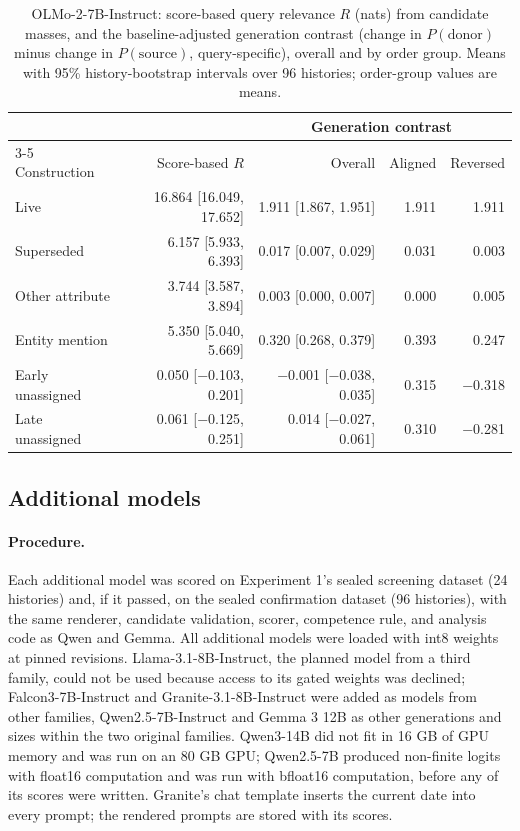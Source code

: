 \begin{table}[h]
\caption{OLMo-2-7B-Instruct: score-based query relevance $R$ (nats) from candidate masses, and the baseline-adjusted generation contrast (change in $P(\text{donor})$ minus change in $P(\text{source})$, query-specific), overall and by order group. Means with 95\% history-bootstrap intervals over 96 histories; order-group values are means.}
\label{tab:f-olmo-r}
\begin{center}
\small
\begin{tabular}{@{}lrrrr@{}}
\toprule
 & & \multicolumn{3}{c}{Generation contrast} \\
\cmidrule(l){3-5}
Construction & Score-based $R$ & Overall & Aligned & Reversed \\
\midrule
Live & 16.864 [16.049, 17.652] & 1.911 [1.867, 1.951] & 1.911 & 1.911 \\
Superseded & 6.157 [5.933, 6.393] & 0.017 [0.007, 0.029] & 0.031 & 0.003 \\
Other attribute & 3.744 [3.587, 3.894] & 0.003 [0.000, 0.007] & 0.000 & 0.005 \\
Entity mention & 5.350 [5.040, 5.669] & 0.320 [0.268, 0.379] & 0.393 & 0.247 \\
Early unassigned & 0.050 [−0.103, 0.201] & −0.001 [−0.038, 0.035] & 0.315 & −0.318 \\
Late unassigned & 0.061 [−0.125, 0.251] & 0.014 [−0.027, 0.061] & 0.310 & −0.281 \\
\bottomrule
\end{tabular}
\end{center}
\end{table}

\subsection{Additional models}

\paragraph{Procedure.} Each additional model was scored on Experiment 1's sealed screening dataset (24 histories) and, if it passed, on the sealed confirmation dataset (96 histories), with the same renderer, candidate validation, scorer, competence rule, and analysis code as Qwen and Gemma. All additional models were loaded with int8 weights at pinned revisions. Llama-3.1-8B-Instruct, the planned model from a third family, could not be used because access to its gated weights was declined; Falcon3-7B-Instruct and Granite-3.1-8B-Instruct were added as models from other families, Qwen2.5-7B-Instruct and Gemma 3 12B as other generations and sizes within the two original families. Qwen3-14B did not fit in 16 GB of GPU memory and was run on an 80 GB GPU; Qwen2.5-7B produced non-finite logits with float16 computation and was run with bfloat16 computation, before any of its scores were written. Granite's chat template inserts the current date into every prompt; the rendered prompts are stored with its scores.

